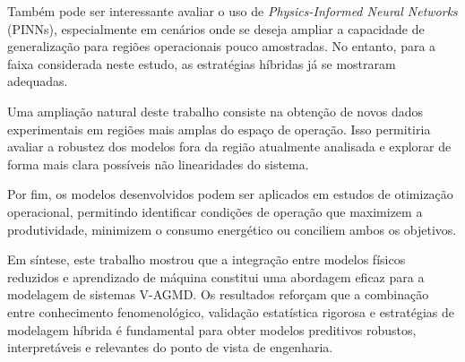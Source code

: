 Também pode ser interessante avaliar o uso de \textit{Physics-Informed Neural Networks} (PINNs), especialmente em cenários onde se deseja ampliar a capacidade de generalização para regiões operacionais pouco amostradas. No entanto, para a faixa considerada neste estudo, as estratégias híbridas já se mostraram adequadas.

Uma ampliação natural deste trabalho consiste na obtenção de novos dados experimentais em regiões mais amplas do espaço de operação. Isso permitiria avaliar a robustez dos modelos fora da região atualmente analisada e explorar de forma mais clara possíveis não linearidades do sistema.

Por fim, os modelos desenvolvidos podem ser aplicados em estudos de otimização operacional, permitindo identificar condições de operação que maximizem a produtividade, minimizem o consumo energético ou conciliem ambos os objetivos.

Em síntese, este trabalho mostrou que a integração entre modelos físicos reduzidos e aprendizado de máquina constitui uma abordagem eficaz para a modelagem de sistemas V-AGMD. Os resultados reforçam que a combinação entre conhecimento fenomenológico, validação estatística rigorosa e estratégias de modelagem híbrida é fundamental para obter modelos preditivos robustos, interpretáveis e relevantes do ponto de vista de engenharia.